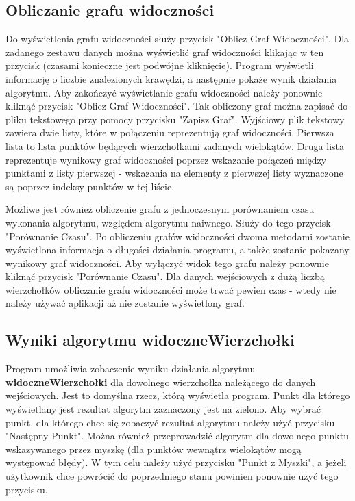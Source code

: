 \documentclass{article}
\begin{document}
\subsection{Obliczanie grafu widoczności}
\qquad Do wyświetlenia grafu widoczności służy przycisk "Oblicz Graf Widoczności". Dla zadanego zestawu danych można wyświetlić graf widoczności klikając w ten przycisk (czasami konieczne jest podwójne kliknięcie). Program wyświetli informację o liczbie znalezionych krawędzi, a następnie pokaże wynik działania algorytmu. Aby zakończyć wyświetlanie grafu widoczności należy ponownie kliknąć przycisk "Oblicz Graf Widoczności". Tak obliczony graf można zapisać do pliku tekstowego przy pomocy przycisku "Zapisz Graf". Wyjściowy plik tekstowy zawiera dwie listy, które w połączeniu reprezentują graf widoczności. Pierwsza lista to lista punktów będących wierzchołkami zadanych wielokątów. Druga lista reprezentuje wynikowy graf widoczności poprzez wskazanie połączeń między punktami z listy pierwszej - wskazania na elementy z pierwszej listy wyznaczone są poprzez indeksy punktów w tej liście.

\noindent \qquad Możliwe jest również obliczenie grafu z jednoczesnym porównaniem czasu wykonania algorytmu, względem algorytmu naiwnego. Służy do tego przycisk "Porównanie Czasu". Po obliczeniu grafów widoczności dwoma metodami zostanie wyświetlona informacja o długości działania programu, a także zostanie pokazany wynikowy graf widoczności. Aby wyłączyć widok tego grafu należy ponownie kliknąć przycisk "Porównanie Czasu". Dla danych wejściowych z dużą liczbą wierzchołków obliczanie grafu widoczności może trwać pewien czas - wtedy nie należy używać aplikacji aż nie zostanie wyświetlony graf.

\subsection{Wyniki algorytmu \textbf{widoczneWierzchołki}}
\qquad Program umożliwia zobaczenie wyniku działania algorytmu \textbf{widoczneWierzchołki} dla dowolnego wierzchołka należącego do danych wejściowych. Jest to domyślna rzecz, którą wyświetla program. Punkt dla którego wyświetlany jest rezultat algorytm zaznaczony jest na zielono. Aby wybrać punkt, dla którego chce się zobaczyć rezultat algorytmu należy użyć przycisku "Następny Punkt". Można również przeprowadzić algorytm dla dowolnego punktu wskazywanego przez myszkę (dla punktów wewnątrz wielokątów mogą występować błędy). W tym celu należy użyć przycisku "Punkt z Myszki", a jeżeli użytkownik chce powrócić do poprzedniego stanu powinien ponownie użyć tego przycisku.
\end{document}
